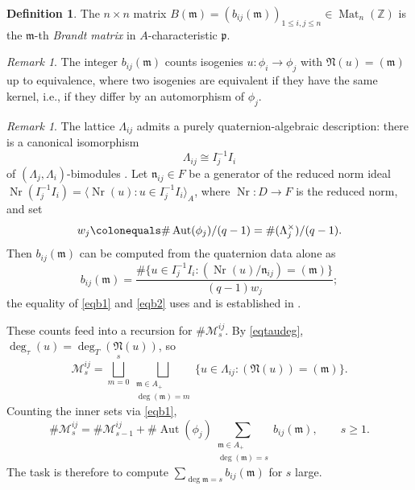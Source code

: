\documentclass[12pt]{amsart}
\theoremstyle{definition}
\newtheorem{defn}[thm]{Definition}
\theoremstyle{remark}
\newtheorem{rem}[thm]{Remark}
\numberwithin{equation}{section}
\numberwithin{thm}{section}
\DeclareMathOperator{\Aut}{Aut}
\DeclareMathOperator{\Mat}{Mat}
\DeclareMathOperator{\Nr}{Nr}
\newcommand{\fN}{\mathfrak{N}}
\newcommand{\fm}{\mathfrak{m}}
\newcommand{\fn}{\mathfrak{n}}
\newcommand{\fp}{\mathfrak{p}}
\newcommand{\cM}{\mathcal{M}}
\newcommand{\Z}{\mathbb{Z}}
\newcommand{\La}{\Lambda}
\begin{document}
	\begin{defn}\label{defnBrandt}
		The $n\times n$ matrix $B(\fm) = (b_{ij}(\fm))_{1\leq i,j\leq n} \in \Mat_n(\Z)$ is the $\fm$-th \textit{Brandt matrix} in $A$-characteristic $\fp$.
	\end{defn}
	
	\begin{rem}
		The integer $b_{ij}(\fm)$ counts isogenies $u\colon\phi_i\to\phi_j$ with $\fN(u)=(\fm)$ up to equivalence, where two isogenies are equivalent if they have the same kernel, i.e., if they differ by an automorphism of $\phi_j$.
	\end{rem}
	
	\begin{rem}\label{rem3.3}
		The lattice $\La_{ij}$ admits a purely quaternion-algebraic description: there is a canonical isomorphism
		\[
		\La_{ij} \cong I_j^{-1}I_i
		\]
		of $(\La_j, \La_i)$-bimodules \cite[Prop. 2.7]{PapikianJNT05}. Let $\fn_{ij}\in F$ be a generator of the reduced norm ideal $\Nr(I_j^{-1}I_i) = \langle \Nr(u) : u\in I_j^{-1}I_i\rangle_A$, where $\Nr\colon D\to F$ is the reduced norm, and set
		\[
		w_j \colonequals \#\Aut(\phi_j)/(q-1) = \#(\La_j^\times)/(q-1).
		\]
		Then $b_{ij}(\fm)$ can be computed from the quaternion data alone as
		\begin{equation}\label{eqb2}
			b_{ij}(\fm) = \frac{\#\{u\in I_j^{-1}I_i : (\Nr(u)/\fn_{ij}) = (\fm)\}}{(q-1)w_j};
		\end{equation}
		the equality of \eqref{eqb1} and \eqref{eqb2} uses \cite[Lem. 3.10]{Gekeler91} and is established in \cite[Prop. 2.7]{PapikianJNT05}.
	\end{rem}
	
	These counts feed into a recursion for $\#\cM_s^{ij}$. By \eqref{eqtaudeg}, $\deg_\tau(u) = \deg_T(\fN(u))$, so
	\[
	\cM_s^{ij} = \bigsqcup_{m=0}^s\bigsqcup_{\substack{\fm\in A_+\\ \deg(\fm)=m}} \{u\in \La_{ij} : (\fN(u)) = (\fm)\}.
	\]
	Counting the inner sets via \eqref{eqb1},
	\begin{equation}\label{eqMsRecursion}
		\#\cM_s^{ij} = \#\cM_{s-1}^{ij} + \#\Aut(\phi_j) \sum_{\substack{\fm\in A_+\\ \deg(\fm)=s}} b_{ij}(\fm), \qquad s\geq 1.
	\end{equation}
	The task is therefore to compute $\sum_{\deg\fm = s} b_{ij}(\fm)$ for $s$ large.
	
\end{document}
